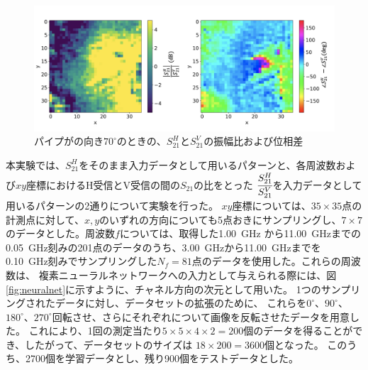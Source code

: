 \documentclass[11pt,a4paper,uplatex]{ujarticle}
\begin{document}
\begin{figure}[tbp]
    \begin{minipage}[b]{0.995\textwidth}
      \centering
      \includegraphics[keepaspectratio, width=130mm]{Images/python/yokonarabe/diff/processed/170.png}
    \end{minipage}
    \caption{パイプがの向き$70^{\circ}$のときの、$S_{21}^{H}$と$S_{21}^{V}$の振幅比および位相差}
  \end{figure}
  

  本実験では、$S_{21}^{H}$をそのまま入力データとして用いるパターンと、各周波数および$xy$座標におけるH受信とV受信の間の$S_{21}$の比をとった
  $\cfrac{S_{21}^{H}}{S_{21}^{V}}$を入力データとして用いるパターンの2通りについて実験を行った。
  $xy$座標については、$35\times35$点の計測点に対して、$x,y$のいずれの方向についても5点おきにサンプリングし、$7\times7$のデータとした。周波数$f$については、取得した1.00~GHz
  から11.00~GHzまでの0.05~GHz刻みの201点のデータのうち、3.00~GHzから11.00~GHzまでを0.10~GHz刻みでサンプリングした$N_f = 81$点のデータを使用した。これらの周波数は、
  複素ニューラルネットワークへの入力として与えられる際には、図\ref{fig:neuralnet}に示すように、チャネル方向の次元として用いた。
  1つのサンプリングされたデータに対し、データセットの拡張のために、
  これらを$0^\circ$、$90^\circ$、$180^\circ$、$270^\circ$回転させ、さらにそれぞれについて画像を反転させたデータを用意した。
  これにより、1回の測定当たり$5\times 5 \times 4 \times 2 = 200$個のデータを得ることができ、したがって、データセットのサイズは
  $18\times 200 = 3600$個となった。
  このうち、2700個を学習データとし、残り900個をテストデータとした。
  
\end{document}
